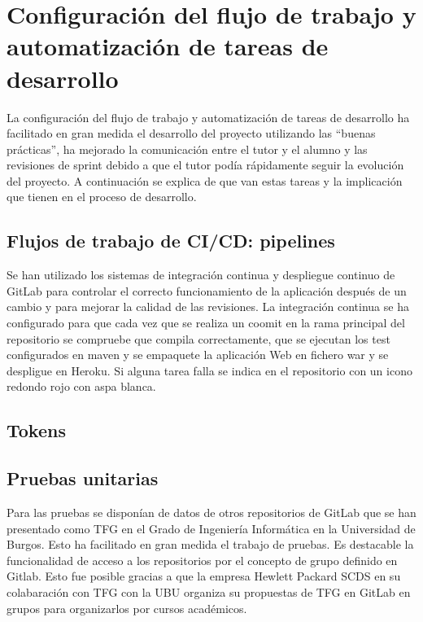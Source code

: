 \section{Configuración del flujo de trabajo y automatización de tareas de desarrollo}
La configuración del flujo de trabajo y automatización de tareas de desarrollo ha facilitado en gran medida el desarrollo del proyecto utilizando las ``buenas prácticas'', ha mejorado la comunicación entre el tutor y el alumno y las revisiones de sprint debido a que el tutor podía rápidamente seguir la evolución del proyecto. A continuación se explica de que van estas tareas y la implicación que tienen en el proceso de desarrollo.

\subsection{Flujos de trabajo de CI/CD: pipelines}
Se han utilizado los sistemas de integración continua y despliegue continuo de GitLab para controlar el correcto funcionamiento de la aplicación después de un cambio y para mejorar la calidad de las revisiones.
La integración continua se ha configurado para que cada vez que se realiza un coomit en la rama principal del repositorio se compruebe que compila correctamente, que se ejecutan los test configurados en maven y se empaquete la aplicación Web en fichero war y se despligue en Heroku. Si alguna tarea falla se indica en el repositorio con un icono redondo rojo con aspa blanca.

\subsection{Tokens}

\subsection{Pruebas unitarias}
Para las pruebas se disponían de datos de otros repositorios de GitLab que se han presentado como TFG en el Grado de Ingeniería Informática en la 
Universidad de Burgos. Esto ha facilitado en gran medida el trabajo de pruebas. 
Es destacable la funcionalidad de acceso a los repositorios por el concepto de grupo definido en Gitlab. Esto fue posible gracias a que la empresa Hewlett Packard SCDS en su colabaración con TFG con la UBU organiza su propuestas de TFG en GitLab en grupos para organizarlos por cursos académicos.

